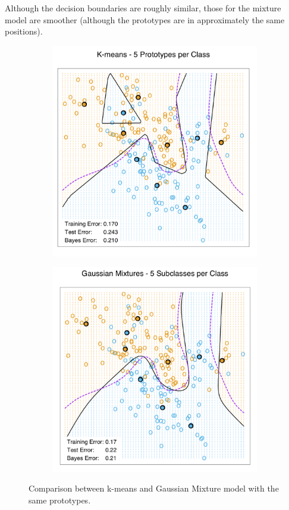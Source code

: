 Although the decision boundaries are roughly similar, those for the mixture model are smoother (although the prototypes are in approximately the same positions). 

\begin{figure}
\begin{subfigure}{0.49\textwidth}
\centering
\includegraphics[width=1\linewidth]{img/kmeans}
\end{subfigure}
\hfill
\begin{subfigure}{0.49\textwidth}
\centering
\includegraphics[width=1\linewidth]{img/GaussianMix}
\end{subfigure}
\caption{Comparison between k-means and Gaussian Mixture model with the same prototypes.}
\end{figure}

